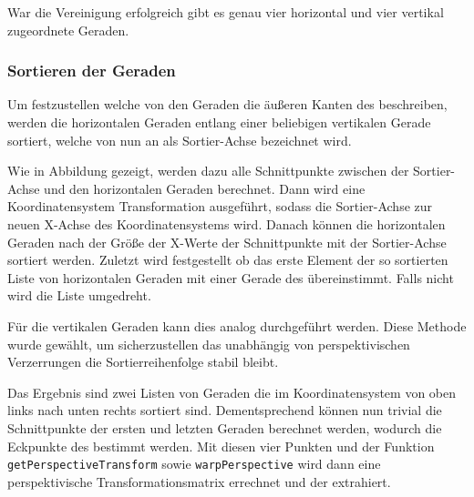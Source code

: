 War die Vereinigung erfolgreich gibt es genau vier horizontal und vier vertikal zugeordnete Geraden.

\subsubsection{Sortieren der Geraden}
Um festzustellen welche von den Geraden die äußeren Kanten des \QRCodes beschreiben, werden die horizontalen Geraden entlang einer beliebigen vertikalen Gerade sortiert, welche von nun an als Sortier-Achse bezeichnet wird. 

Wie in Abbildung  gezeigt, werden dazu alle Schnittpunkte zwischen der Sortier-Achse und den horizontalen Geraden berechnet. Dann wird eine Koordinatensystem Transformation ausgeführt, sodass die Sortier-Achse zur neuen X-Achse des Koordinatensystems wird. Danach können die horizontalen Geraden nach der Größe der X-Werte der Schnittpunkte mit der Sortier-Achse sortiert werden. Zuletzt wird festgestellt ob das erste Element der so sortierten Liste von horizontalen Geraden mit einer Gerade des \olfp übereinstimmt. Falls nicht wird die Liste umgedreht.

Für die vertikalen Geraden kann dies analog durchgeführt werden. Diese Methode wurde gewählt, um sicherzustellen das unabhängig von perspektivischen Verzerrungen die Sortierreihenfolge stabil bleibt.

Das Ergebnis sind zwei Listen von Geraden die im \QRCode Koordinatensystem von oben links nach unten rechts sortiert sind. Dementsprechend können nun trivial die Schnittpunkte der ersten und letzten Geraden berechnet werden, wodurch die Eckpunkte des \QRCodes bestimmt werden. Mit diesen vier Punkten und der \OpenCV Funktion  \texttt{getPerspectiveTransform} sowie \texttt{warpPerspective} wird dann eine perspektivische Transformationsmatrix errechnet und der \QRCode extrahiert. 
